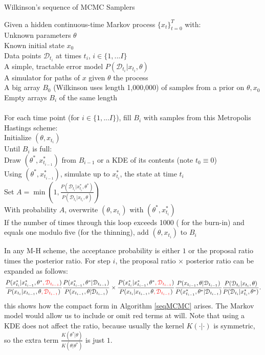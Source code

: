 \documentclass{article}
\newcommand\red[1]{\textcolor{red}{#1}}
\begin{document}
\begin{algorithm}[h]
\caption{ \label{seqMCMC} Wilkinson's sequence of MCMC Samplers}
Given a hidden continuous-time Markov process $\{x_t\}_{t=0}^T$ with: \\
\Indp \Indp
Unknown parameters $\theta$\\
Known initial state $x_0$\\
Data points $\mathcal{D}_{t_{i}}$ at times $t_{i}$, $i \in \{1, ... I\}$ \\
A simple, tractable error model $P(\mathcal{D}_{t_{i}}|x_{t_{i}}, \theta)$\\
A simulator for paths of $x$ given $\theta$ the process\\
A big array $B_0$ (Wilkinson uses length 1,000,000) of samples from a prior on $\theta, x_0$\\
Empty arrays $B_{i}$ of the same length\\
$\phantom{0}$\\
\Indm \Indm
For each time point (for $i \in \{1, ... I\}$), fill $B_{i}$ with samples from this Metropolis Hastings scheme:\\
\Indp\Indp
Initialize $(\theta, x_{t_{i}})$ \\
Until $B_{i}$ is full: \\
\Indp\Indp
Draw $(\theta^*, x_{t_{i-1}}^*)$ from $B_{i-1}$ or a KDE of its contents (note $t_0\equiv0$)\\
Using $(\theta^*, x_{t_{i-1}}^*)$, simulate up to $x_{t_{i}}^*$, the state at time $t_{i}$ \\
Set $A=\min(1, \frac{P(\mathcal{D}_{t_{i}}|x_{t_{i}}^*, \theta^*)}{P(\mathcal{D}_{t_{i}}|x_{t_{i}}, \theta)})$\\
With probability $A$, overwrite $(\theta, x_{t_{i}})$ with $(\theta^*, x_{t_{i}}^*)$\\
If the number of times through this loop exceeds 1000 ( for the burn-in) and equals one modulo five (for the thinning), add $(\theta, x_{t_{i}})$ to $B_{i}$\\
\Indm \Indm
\end{algorithm}


In any M-H scheme, the acceptance probability is either $1$ or the proposal ratio times the posterior ratio. For step $i$, the proposal ratio $\times$ posterior ratio can be expanded as follows:
$$ \frac{P(x_{t_{i}}^*| x_{t_{i-1}}^*,\theta^*\red{, \mathcal{D}_{t_{i-1}}})}{P(x_{t_{i}}| x_{t_{i-1}}, \theta \red{, \mathcal{D}_{t_{i-1}}})} 
\frac{P(x_{t_{i-1}}^*,\theta^*| \mathcal{D}_{t_{i-1}})}{P(x_{t_{i-1}}, \theta| \mathcal{D}_{t_{i-1}})}
\times 
\frac{P(x_{t_{i}}^*| x_{t_{i-1}}^*,\theta^*\red{, \mathcal{D}_{t_{i-1}}})}{P(x_{t_{i}}| x_{t_{i-1}}, \theta \red{, \mathcal{D}_{t_{i-1}}})}
\frac{ P(x_{t_{i-1}}, \theta| \mathcal{D}_{t_{i-1}})}{ P( x_{t_{i-1}}^*,\theta^*| \mathcal{D}_{t_{i-1}})}   
\frac{P(\mathcal{D}_{t_{i}}|x_{t_{i}}, \theta)}{P(\mathcal{D}_{t_{i}}|x_{t_{i}}^*, \theta^*)}.$$   
this shows how the compact form in Algorithm \ref{seqMCMC} arises. The Markov model would allow us to include or omit red terms at will. Note that using a KDE does not affect the ratio, because usually the kernel $K(\cdot|\cdot)$ is symmetric, so the extra term $\frac{K(\theta^*|\theta)}{K(\theta|\theta^*)}$ is just $1$.
\end{document}
